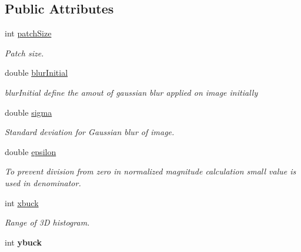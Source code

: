 \subsection*{\-Public \-Attributes}
\begin{DoxyCompactItemize}
\item 
int \hyperlink{classDescriptor_a1ae195a424d69f9e1d754fcceee3c0ad}{patch\-Size}
\begin{DoxyCompactList}\small\item\em \-Patch size. \end{DoxyCompactList}\item 
\hypertarget{classDescriptor_a3c1aa9d535ace644e5fa39f58aeac6cd}{double \hyperlink{classDescriptor_a3c1aa9d535ace644e5fa39f58aeac6cd}{blur\-Initial}}\label{classDescriptor_a3c1aa9d535ace644e5fa39f58aeac6cd}

\begin{DoxyCompactList}\small\item\em blur\-Initial define the amout of gaussian blur applied on image initially \end{DoxyCompactList}\item 
\hypertarget{classDescriptor_aaf3c7a659238b79e56ec12ac14a897a3}{double \hyperlink{classDescriptor_aaf3c7a659238b79e56ec12ac14a897a3}{sigma}}\label{classDescriptor_aaf3c7a659238b79e56ec12ac14a897a3}

\begin{DoxyCompactList}\small\item\em \-Standard deviation for \-Gaussian blur of image. \end{DoxyCompactList}\item 
\hypertarget{classDescriptor_a69c1674606ab53a1ef438048bf7ad746}{double \hyperlink{classDescriptor_a69c1674606ab53a1ef438048bf7ad746}{epsilon}}\label{classDescriptor_a69c1674606ab53a1ef438048bf7ad746}

\begin{DoxyCompactList}\small\item\em \-To prevent division from zero in normalized magnitude calculation small value is used in denominator. \end{DoxyCompactList}\item 
\hypertarget{classDescriptor_a06c7e988065fa55b338ab84448b98c3d}{int \hyperlink{classDescriptor_a06c7e988065fa55b338ab84448b98c3d}{xbuck}}\label{classDescriptor_a06c7e988065fa55b338ab84448b98c3d}

\begin{DoxyCompactList}\small\item\em \-Range of 3\-D histogram. \end{DoxyCompactList}\item 
\hypertarget{classDescriptor_a44811fe508cef265a1c15fb81d53ef4e}{int {\bfseries ybuck}}\label{classDescriptor_a44811fe508cef265a1c15fb81d53ef4e}


\end{DoxyCompactItemize}
